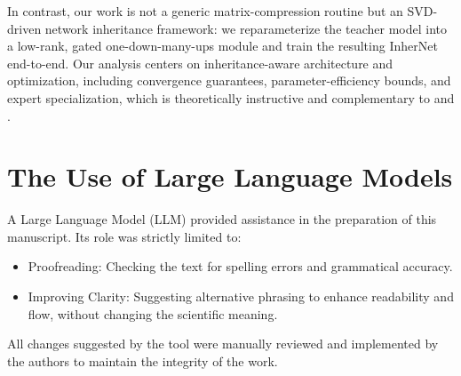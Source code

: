 \documentclass{article} %
\begin{document}
In contrast, our work is not a generic matrix-compression routine but an SVD-driven network inheritance framework: we reparameterize the teacher model into a low-rank, gated one-down-many-ups module and train the resulting InherNet end-to-end. Our analysis centers on inheritance-aware architecture and optimization, including convergence guarantees, parameter-efficiency bounds, and expert specialization, which is theoretically instructive and complementary to \cite{saha2023matrix} and \cite{saha2024compressing}.

\section{The Use of Large Language Models}
\label{sec:LLM}
A Large Language Model (LLM) provided assistance in the preparation of this manuscript. Its role was strictly limited to:

\begin{itemize}
    \item {Proofreading: Checking the text for spelling errors and grammatical accuracy.}
    \item {Improving Clarity: Suggesting alternative phrasing to enhance readability and flow, without changing the scientific meaning.}
\end{itemize}


All changes suggested by the tool were manually reviewed and implemented by the authors to maintain the integrity of the work.
\end{document}
